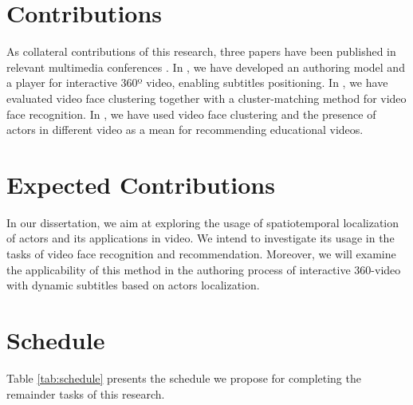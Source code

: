 \section{Contributions}
\label{sec_contritutions}
 As collateral contributions of this research, three papers have been published in relevant multimedia conferences \cite{mendes2020cluster, mendes2020authoring, mendes2020ISM}. In \cite{mendes2020authoring}, we have developed an authoring model and a player for interactive 360º video, enabling subtitles positioning. In \cite{mendes2020cluster}, we have evaluated video face clustering together with a cluster-matching method for video face recognition. In \cite{mendes2020ISM}, we have used video face clustering and the presence of actors in different video as a mean for recommending educational videos.
 
\section{Expected Contributions}
\label{sec_expected}
In our dissertation, we aim at exploring the usage of spatiotemporal localization of actors and its applications in video. We intend to investigate its usage in the tasks of video face recognition and recommendation. Moreover, we will examine the applicability of this method in the authoring process of interactive 360-video with dynamic subtitles based on actors localization.


\section{Schedule}
\label{sec_schedule}
Table \ref{tab:schedule} presents the schedule we propose for completing the remainder tasks of this research.

